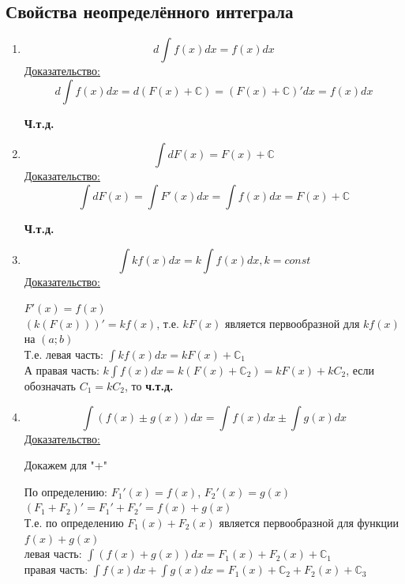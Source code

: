 \documentclass[12pt]{article}
\begin{document}
    \subsection{Свойства неопределённого интеграла}
    \begin{enumerate}
        \item \[ d \int f(x) dx = f(x)dx \]
        \underline{Доказательство:}
        \[ d \int f(x)dx = d(F(x) + \mathbb{C}) = (F(x) + \mathbb{C})'dx = f(x)dx \]
        \begin{center}
            \textbf{Ч.т.д.}
        \end{center}
        \item \[ \int dF(x) = F(x) + \mathbb{C} \]
        \underline{Доказательство:}
        \[ \int dF(x) = \int F'(x)dx = \int f(x)dx = F(x) + \mathbb{C} \]
        \begin{center}
            \textbf{Ч.т.д.}
        \end{center}
        \item \[ \int k f(x) dx = k \int f(x) dx, k = const \]
        \underline{Доказательство:}
        \begin{adjustwidth}{1.5em}{1.5em}
            $F'(x) = f(x)$\\
            $(k(F(x)))' = kf(x)$, т.е. $kF(x)$ является первообразной для $kf(x)$ на $(a; b)$\\
            Т.е. левая часть: $\int kf(x)dx = kF(x) + \mathbb{C}_1$\\
            А правая часть: $k \int f(x)dx = k(F(x) + \mathbb{C}_2) = kF(x) + kC_2$, если обозначать $C_1 = kC_2$, то \textbf{ч.т.д.}
        \end{adjustwidth}
        \item \[ \int (f(x) \pm g(x)) dx = \int f(x) dx \pm \int g(x)dx \]
        \underline{Доказательство:}
        \begin{adjustwidth}{1.5em}{1.5em}
            Докажем для "+"\par\noindent
            По определению: $F_1'(x) = f(x)$, $F_2'(x) = g(x)$\\
            $(F_1 + F_2)' = F_1' + F_2' = f(x) + g(x)$\\
            Т.е. по определению $F_1(x) + F_2(x)$ является первообразной для функции $f(x) + g(x)$\\
            левая часть: $\int (f(x) + g(x))dx = F_1(x) + F_2(x) + \mathbb{C}_1$\\
            правая часть: $\int f(x)dx + \int g(x)dx = F_1(x) + \mathbb{C}_2 + F_2(x) + \mathbb{C}_3$\\

\end{adjustwidth}
\end{enumerate}
\end{document}
